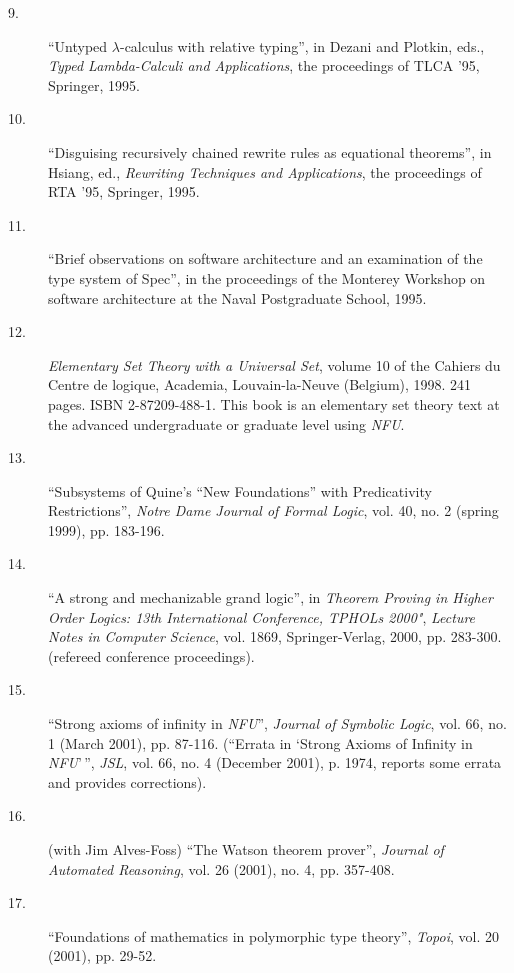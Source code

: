 \begin{description}
\begin{description}
\item [9.] ``Untyped $\lambda$-calculus with relative typing'', in Dezani
  and Plotkin, eds., {\em Typed Lambda-Calculi and Applications\/},
  the proceedings of TLCA '95, Springer, 1995.

\item[10.] ``Disguising recursively chained rewrite rules as equational
  theorems'', in Hsiang, ed., {\em Rewriting Techniques and
    Applications\/}, the proceedings of RTA '95, Springer, 1995.

\item[11.] ``Brief observations on software architecture and an
  examination of the type system of Spec'', in the proceedings of the
  Monterey Workshop on software architecture at the Naval Postgraduate
  School, 1995.

\item [12.]  {\em Elementary Set Theory with a
Universal Set\/}, volume 10 of the Cahiers du Centre de logique,
Academia, Louvain-la-Neuve (Belgium), 1998. 241 pages. ISBN
2-87209-488-1.  This book is an elementary set theory text at the
advanced undergraduate or graduate level using {\em NFU\/}.

\item[13.]  ``Subsystems of Quine's ``New Foundations'' with
Predicativity Restrictions'', {\em Notre Dame Journal of
Formal Logic\/}, vol. 40, no. 2 (spring 1999), pp. 183-196.

\item[14.]  ``A strong and mechanizable grand logic'', in {\em Theorem
Proving in Higher Order Logics: 13th International Conference, TPHOLs
2000"\/}, {\em Lecture Notes in Computer Science\/}, vol. 1869,
Springer-Verlag, 2000, pp. 283-300.  (refereed conference
proceedings).

\item[15.]  ``Strong axioms of infinity in {\em NFU\/}'', {\em Journal
of Symbolic Logic\/}, vol. 66, no. 1 (March 2001), pp. 87-116.  (``Errata in `Strong Axioms of Infinity in {\em NFU\/}'\,'', {\em JSL\/}, vol. 66, no. 4 (December 2001), p. 1974, reports some errata and provides corrections).

\item[16.]  (with Jim Alves-Foss) ``The Watson theorem prover'', {\em
Journal of Automated Reasoning\/}, vol. 26 (2001), no. 4, pp. 357-408.

\item[17.]  ``Foundations of mathematics in polymorphic type theory'',
{\em Topoi\/}, vol. 20 (2001), pp. 29-52.


\end{description}
\end{description}
